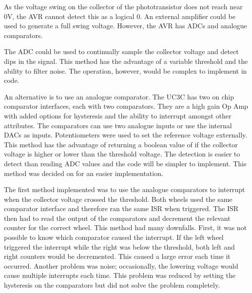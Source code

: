 As the voltage swing on the collector of the phototransistor does not reach near 0V, the AVR cannot detect this as a logical 0. An external amplifier could be used to generate a full swing voltage. However, the AVR has ADCs and analogue comparators. 

The ADC could be used to continually sample the collector voltage and detect dips in the signal. This method has the advantage of a variable threshold and the ability to filter noise. The operation, however, would be complex to implement in code. 

An alternative is to use an analogue comparator. The UC3C has two on chip comparator interfaces, each with two comparators. They are a high gain Op Amp with added options for hysteresis and the ability to interrupt amongst other attributes. The comparators can use two analogue inputs or use the internal DACs as inputs. Potentiometers were used to set the reference voltage externally. %
This method has the advantage of returning a boolean value of if the collector voltage is higher or lower than the threshold voltage. The detection is easier to detect than reading ADC values and the code will be simpler to implement. This method was decided on for an easier implementation.

The first method implemented was to use the analogue comparators to interrupt when the collector voltage crossed the threshold. Both wheels used the same comparator interface and therefore ran the same ISR when triggered. The ISR then had to read the output of the comparators and decrement the relevant counter for the correct wheel. This method had many downfalls. First, it was not possible to know which comparator caused the interrupt. If the left wheel triggered the interrupt while the right was below the threshold, both left and right counters would be decremented. This caused a large error each time it occurred. Another problem was noise; occasionally, the lowering voltage would cause multiple interrupts each time. This problem was reduced by setting the hysteresis on the comparators but did not solve the problem completely. 

